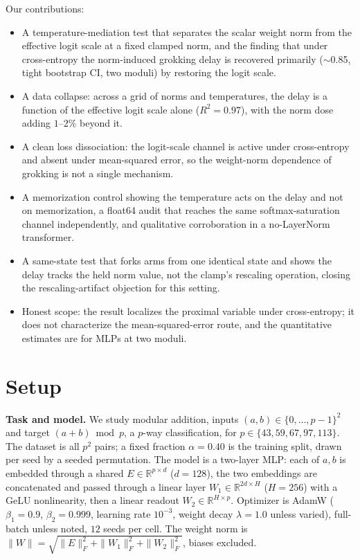 Our contributions:
\begin{itemize}
\item A temperature-mediation test that separates the scalar weight norm from the effective logit scale at
a fixed clamped norm, and the finding that under cross-entropy the norm-induced grokking delay is recovered
primarily ($\sim$0.85, tight bootstrap CI, two moduli) by restoring the logit scale.
\item A data collapse: across a grid of norms and temperatures, the delay is a function of the effective
logit scale alone ($R^2=0.97$), with the norm dose adding $1$--$2\%$ beyond it.
\item A clean loss dissociation: the logit-scale channel is active under cross-entropy and absent under
mean-squared error, so the weight-norm dependence of grokking is not a single mechanism.
\item A memorization control showing the temperature acts on the delay and not on memorization, a float64
audit that reaches the same softmax-saturation channel independently, and qualitative corroboration in a
no-LayerNorm transformer.
\item A same-state test that forks arms from one identical state and shows the delay tracks the held norm
value, not the clamp's rescaling operation, closing the rescaling-artifact objection for this setting.
\item Honest scope: the result localizes the proximal variable under cross-entropy; it does not
characterize the mean-squared-error route, and the quantitative estimates are for MLPs at two moduli.
\end{itemize}

\section{Setup}

\textbf{Task and model.} We study modular addition, inputs $(a,b)\in\{0,\dots,p-1\}^2$ and target
$(a+b)\bmod p$, a $p$-way classification, for $p\in\{43,59,67,97,113\}$. The dataset is all $p^2$ pairs; a
fixed fraction $\alpha=0.40$ is the training split, drawn per seed by a seeded permutation. The model is a
two-layer MLP: each of $a,b$ is embedded through a shared $E\in\mathbb{R}^{p\times d}$ ($d=128$), the two
embeddings are concatenated and passed through a linear layer $W_1\in\mathbb{R}^{2d\times H}$ ($H=256$)
with a GeLU nonlinearity, then a linear readout $W_2\in\mathbb{R}^{H\times p}$. Optimizer is AdamW
($\beta_1=0.9$, $\beta_2=0.999$, learning rate $10^{-3}$, weight decay $\lambda=1.0$ unless varied),
full-batch unless noted, $12$ seeds per cell. The weight norm is
$\|W\|=\sqrt{\|E\|_F^2+\|W_1\|_F^2+\|W_2\|_F^2}$, biases excluded.

